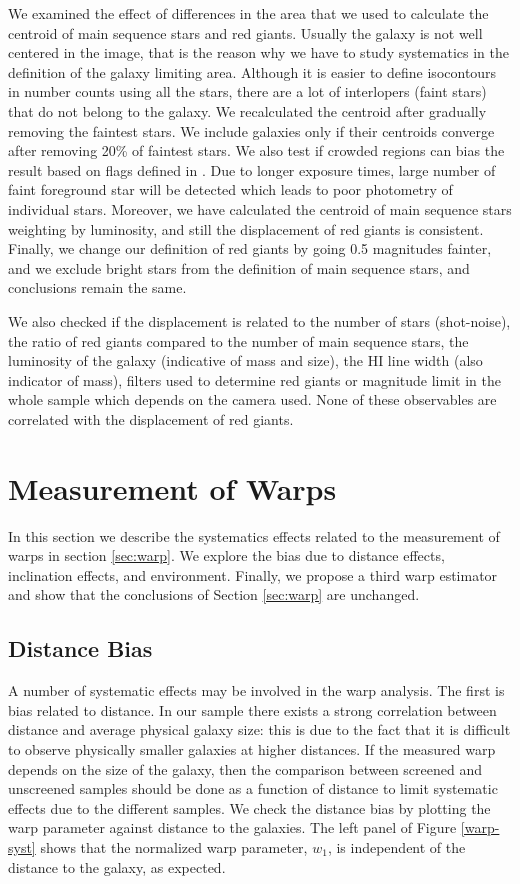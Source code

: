 \documentclass[twocolappendix, numberedappendix]{emulateapj}
\begin{document}
We examined the effect of differences in
the area that we used to calculate the centroid of main sequence stars and red
giants. Usually the galaxy is not well centered in the image, that is the
reason why we have to study systematics in the definition of 
the galaxy limiting area. Although it is easier to define isocontours in
number counts using all the stars, there are a lot of interlopers (faint stars)
that do not belong to the galaxy. We recalculated the centroid
after gradually removing the faintest stars. We include galaxies only if their
centroids converge after removing 20\% of faintest stars.
We also test if crowded regions can bias the result based on flags defined in
\citet{dalcanton09}. Due to longer exposure times, large number of faint
foreground star will be detected which leads to poor photometry of individual
stars. Moreover, we have calculated the centroid of main sequence stars
weighting by luminosity, and still the displacement of red giants is consistent.
Finally, we change our definition of red giants by going 0.5
magnitudes fainter, and we exclude bright stars from the definition of
main sequence stars, and conclusions remain the same. 


We also checked if the displacement is related to the number of stars
(shot-noise), the ratio of red giants compared to the number of main sequence
stars,
the luminosity of the galaxy (indicative of mass and size),  the HI line
width (also indicator of mass), filters used to determine red giants or
magnitude limit in the whole sample which depends on the
camera used. None of these observables are correlated with the
displacement of red giants.


\section{Measurement of Warps}
\label{ap:warp}
In this section we describe the systematics effects related to the measurement of warps in
section \ref{sec:warp}.
We explore the bias due to distance effects, inclination effects,
and environment.  Finally, we propose a third warp estimator
and show that the conclusions of Section \ref{sec:warp} are unchanged.
 
\subsection{Distance Bias}
\label{ap:distance-systematic}
A number of systematic effects may be involved in the warp analysis.
The first is bias related to distance.
In our sample there exists a strong correlation between
distance and average physical galaxy size:
this is due to the fact that it is difficult to observe physically
smaller galaxies at higher distances. If the measured warp depends on the
size of the galaxy, then the comparison between screened and unscreened
samples should be done as a function of distance to limit systematic effects
due to the different samples.
We check the distance bias by plotting the warp parameter against
distance to the galaxies. The left panel of Figure \ref{warp-syst} shows that
the normalized warp parameter, $w_1$, is independent of the distance to
the galaxy, as expected.
\end{document}
